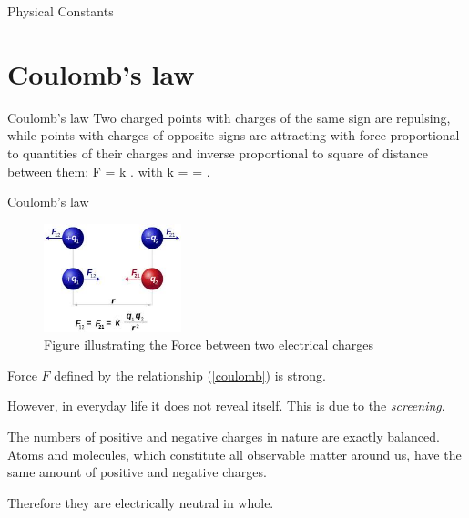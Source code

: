 \documentclass[10pt]{beamer}
\begin{document}
\begin{frame}[shrink=40]{Physical Constants}
\end{frame}



\section{Coulomb's law}
\begin{frame}[fragile]{Coulomb's law}
%
Two charged points with \alert{charges of the same sign are repulsing},
while points with \alert{charges of opposite signs are attracting} with
force proportional to quantities of their charges and inverse
proportional to square of distance between them:
\be
F = k . \label{coulomb}
\ee
with 
\be
k =  = .
\ee

\end{frame}

\begin{frame}[fragile]{Coulomb's law}

\begin{figure}
\centering
\includegraphics[width=40mm]{Coulomb.jpeg}
\caption{Figure illustrating the Force between two electrical charges }
\label{echarges}
\end{figure}

\end{frame}


\begin{frame}[fragile]{}

Force $F$ defined by the relationship (\ref{coulomb}) is \alert{strong}.

However, in everyday life it does not reveal itself. 
This is due
to the \alert{{\it screening}}. 

\alert{The numbers of positive and negative charges
in nature are exactly balanced}. Atoms and molecules, which
constitute all observable matter around us, have the same amount of
positive and negative charges. 

Therefore they are electrically neutral
in whole. 

\end{frame}
\end{document}
